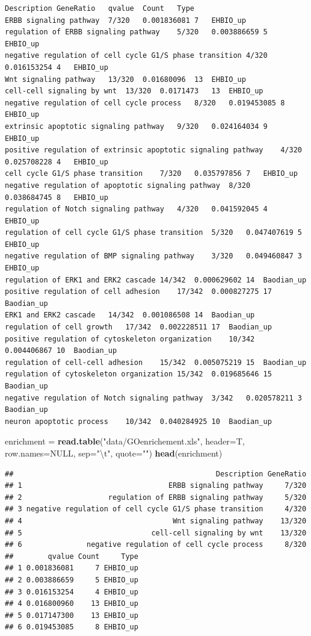 \documentclass[]{article}
\newenvironment{Shaded}{\begin{snugshade}}{\end{snugshade}}
\newcommand{\KeywordTok}[1]{\textcolor[rgb]{0.13,0.29,0.53}{\textbf{{#1}}}}
\newcommand{\DataTypeTok}[1]{\textcolor[rgb]{0.13,0.29,0.53}{{#1}}}
\newcommand{\CharTok}[1]{\textcolor[rgb]{0.31,0.60,0.02}{{#1}}}
\newcommand{\StringTok}[1]{\textcolor[rgb]{0.31,0.60,0.02}{{#1}}}
\newcommand{\OtherTok}[1]{\textcolor[rgb]{0.56,0.35,0.01}{{#1}}}
\newcommand{\NormalTok}[1]{{#1}}
\numberwithin{figure}{section}
\numberwithin{table}{section}
\theoremstyle{definition}
\theoremstyle{definition}
\theoremstyle{definition}
\theoremstyle{remark}
\begin{document}
\begin{verbatim}
Description GeneRatio   qvalue  Count   Type
ERBB signaling pathway  7/320   0.001836081 7   EHBIO_up
regulation of ERBB signaling pathway    5/320   0.003886659 5   EHBIO_up
negative regulation of cell cycle G1/S phase transition 4/320   0.016153254 4   EHBIO_up
Wnt signaling pathway   13/320  0.01680096  13  EHBIO_up
cell-cell signaling by wnt  13/320  0.0171473   13  EHBIO_up
negative regulation of cell cycle process   8/320   0.019453085 8   EHBIO_up
extrinsic apoptotic signaling pathway   9/320   0.024164034 9   EHBIO_up
positive regulation of extrinsic apoptotic signaling pathway    4/320   0.025708228 4   EHBIO_up
cell cycle G1/S phase transition    7/320   0.035797856 7   EHBIO_up
negative regulation of apoptotic signaling pathway  8/320   0.038684745 8   EHBIO_up
regulation of Notch signaling pathway   4/320   0.041592045 4   EHBIO_up
regulation of cell cycle G1/S phase transition  5/320   0.047407619 5   EHBIO_up
negative regulation of BMP signaling pathway    3/320   0.049460847 3   EHBIO_up
regulation of ERK1 and ERK2 cascade 14/342  0.000629602 14  Baodian_up
positive regulation of cell adhesion    17/342  0.000827275 17  Baodian_up
ERK1 and ERK2 cascade   14/342  0.001086508 14  Baodian_up
regulation of cell growth   17/342  0.002228511 17  Baodian_up
positive regulation of cytoskeleton organization    10/342  0.004406867 10  Baodian_up
regulation of cell-cell adhesion    15/342  0.005075219 15  Baodian_up
regulation of cytoskeleton organization 15/342  0.019685646 15  Baodian_up
negative regulation of Notch signaling pathway  3/342   0.020578211 3   Baodian_up
neuron apoptotic process    10/342  0.040284925 10  Baodian_up
\end{verbatim}

\begin{Shaded}
\begin{Highlighting}[]
\NormalTok{enrichment =}\StringTok{ }\KeywordTok{read.table}\NormalTok{(}\StringTok{"data/GOenrichement.xls"}\NormalTok{, }\DataTypeTok{header=}\NormalTok{T, }\DataTypeTok{row.names=}\OtherTok{NULL}\NormalTok{, }
    \DataTypeTok{sep=}\StringTok{"}\CharTok{\textbackslash{}t}\StringTok{"}\NormalTok{, }\DataTypeTok{quote=}\StringTok{""}\NormalTok{)}
\KeywordTok{head}\NormalTok{(enrichment)}
\end{Highlighting}
\end{Shaded}

\begin{verbatim}
##                                               Description GeneRatio
## 1                                  ERBB signaling pathway     7/320
## 2                    regulation of ERBB signaling pathway     5/320
## 3 negative regulation of cell cycle G1/S phase transition     4/320
## 4                                   Wnt signaling pathway    13/320
## 5                              cell-cell signaling by wnt    13/320
## 6               negative regulation of cell cycle process     8/320
##        qvalue Count     Type
## 1 0.001836081     7 EHBIO_up
## 2 0.003886659     5 EHBIO_up
## 3 0.016153254     4 EHBIO_up
## 4 0.016800960    13 EHBIO_up
## 5 0.017147300    13 EHBIO_up
## 6 0.019453085     8 EHBIO_up
\end{verbatim}
\end{document}
